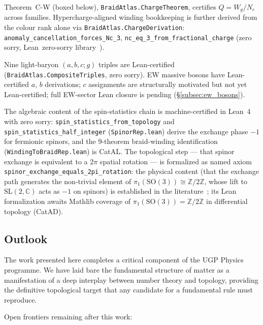 \documentclass[11pt]{article}
\theoremstyle{remark}
\begin{document}
Theorem~C-W (boxed below), \texttt{BraidAtlas.ChargeTheorem}, certifies $Q = W_g/N_c$ across families. Hypercharge-aligned winding bookkeeping is further derived from the colour rank alone via \texttt{BraidAtlas.ChargeDerivation}: \texttt{anomaly\_cancellation\_forces\_Nc\_3}, \texttt{nc\_eq\_3\_from\_fractional\_charge} (zero sorry, Lean~zero-sorry library~\cite{ugp-lean,SpivackUGPFormalization}).

Nine light-baryon $(a,b,c;g)$ triples are Lean-certified (\texttt{BraidAtlas.CompositeTriples}, zero sorry). EW massive bosons have Lean-certified $a$, $b$ derivations; $c$ assignments are structurally motivated but not yet Lean-certified; full EW-sector Lean closure is pending (\S\ref{subsec:ew_bosons}).

The algebraic content of the spin-statistics chain is machine-certified in Lean~4 with zero sorry: \texttt{spin\_statistics\_from\_topology} and \texttt{spin\_statistics\_half\_integer} (\texttt{SpinorRep.lean}) derive the exchange phase $-1$ for fermionic spinors, and the 9-theorem braid-winding identification (\texttt{WindingToBraidRep.lean}) is CatAL. The topological step --- that spinor exchange is equivalent to a $2\pi$ spatial rotation --- is formalized as named axiom \texttt{spinor\_exchange\_equals\_2pi\_rotation}: the physical content (that the exchange path generates the non-trivial element of $\pi_1(\mathrm{SO}(3)) \cong \mathbb{Z}/2\mathbb{Z}$, whose lift to $\mathrm{SL}(2,\mathbb{C})$ acts as $-1$ on spinors) is established in the literature~\cite{Streater1964,Leinaas1977}; its Lean formalization awaits Mathlib coverage of $\pi_1(\mathrm{SO}(3)) = \mathbb{Z}/2\mathbb{Z}$ in differential topology (CatAD).

\subsection{Outlook}

The work presented here completes a critical component of the UGP Physics programme. We have laid bare the fundamental structure of matter as a manifestation of a deep interplay between number theory and topology, providing the definitive topological target that any candidate for a fundamental rule must reproduce.

Open frontiers remaining after this work:
\end{document}
